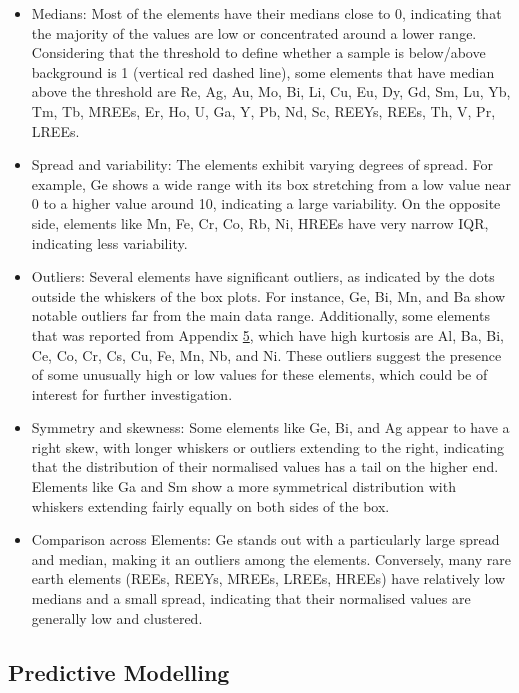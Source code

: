 \documentclass[11pt,a4paper,]{article}
\providecommand{\tightlist}{%
  \setlength{\itemsep}{0pt}\setlength{\parskip}{0pt}}
\begin{document}
\begin{itemize}
\tightlist
\item
  Medians: Most of the elements have their medians close to 0, indicating that the majority of the values are low or concentrated around a lower range. Considering that the threshold to define whether a sample is below/above background is 1 (vertical red dashed line), some elements that have median above the threshold are Re, Ag, Au, Mo, Bi, Li, Cu, Eu, Dy, Gd, Sm, Lu, Yb, Tm, Tb, MREEs, Er, Ho, U, Ga, Y, Pb, Nd, Sc, REEYs, REEs, Th, V, Pr, LREEs.
\item
  Spread and variability: The elements exhibit varying degrees of spread. For example, Ge shows a wide range with its box stretching from a low value near 0 to a higher value around 10, indicating a large variability. On the opposite side, elements like Mn, Fe, Cr, Co, Rb, Ni, HREEs have very narrow IQR, indicating less variability.
\item
  Outliers: Several elements have significant outliers, as indicated by the dots outside the whiskers of the box plots. For instance, Ge, Bi, Mn, and Ba show notable outliers far from the main data range. Additionally, some elements that was reported from Appendix \href{\%7B\#appendix-five\%7D}{5}, which have high kurtosis are Al, Ba, Bi, Ce, Co, Cr, Cs, Cu, Fe, Mn, Nb, and Ni. These outliers suggest the presence of some unusually high or low values for these elements, which could be of interest for further investigation.
\item
  Symmetry and skewness: Some elements like Ge, Bi, and Ag appear to have a right skew, with longer whiskers or outliers extending to the right, indicating that the distribution of their normalised values has a tail on the higher end. Elements like Ga and Sm show a more symmetrical distribution with whiskers extending fairly equally on both sides of the box.
\item
  Comparison across Elements: Ge stands out with a particularly large spread and median, making it an outliers among the elements. Conversely, many rare earth elements (REEs, REEYs, MREEs, LREEs, HREEs) have relatively low medians and a small spread, indicating that their normalised values are generally low and clustered.
\end{itemize}

\subsection{Predictive Modelling}\label{predictive-modelling}
\end{document}
